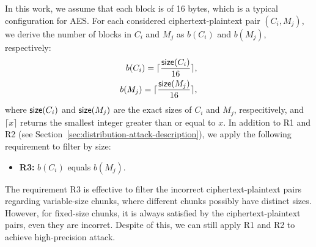 \documentclass[bachelor]{thesis-uestc}
\begin{document}


In this work, we assume that each block is of 16 bytes, which is a typical configuration for AES. For each considered ciphertext-plaintext pair $(C_i, M_j)$, we derive the number of blocks in $C_i$ and $M_j$ as $b({C_i})$ and $b({M_j})$, respectively:
\begin{eqnarray*}
b({C_i}) = \lceil \frac{{\sf size}(C_i)}{16} \rceil, \nonumber \\
b({M_j}) = \lceil \frac{{\sf size}(M_j)}{16} \rceil, \nonumber 
\end{eqnarray*}
where ${\sf size}(C_i)$ and ${\sf size}(M_j)$ are the exact sizes of $C_i$ and $M_j$, respecitively, and $\lceil x \rceil$ returns the smallest integer greater than or equal to $x$. In addition to R1 and R2 (see Section~\ref{sec:distribution-attack-description}), we apply the following requirement to filter by size:    
\begin{itemize}[leftmargin=*]
    \item {\bf R3:} $b({C_i})$ equals $b({M_j})$.
\end{itemize}

The requirement R3 is effective to filter the incorrect ciphertext-plaintext pairs regarding variable-size chunks, where different chunks possibly have distinct sizes. However, for fixed-size chunks, it is always satisfied by the ciphertext-plaintext pairs, even they are incorret. Despite of this, we can still apply R1 and R2 to achieve high-precision attack.        




\end{document}
